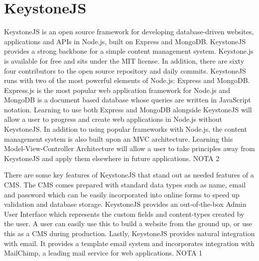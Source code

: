 \section{KeystoneJS}
\label{sec:CMS_ksjs}

KeystoneJS is an open source framework for developing database-driven websites, applications and APIs in Node.js, built on Express and MongoDB.
KeystoneJS provides a strong backbone for a simple content management system. Keystone.js is available for free and sits under the MIT license. In addition, there are sixty four contributors to the open source repository and daily commits.
KeystoneJS runs with two of the most powerful elements of Node.js: Express and MongoDB. Express.js is the most popular web application framework for Node.js and MongoDB is a document based database whose queries are written in JavaScript notation. Learning to use both Express and MongoDB alongside KeystoneJS will allow a user to progress and create web applications in Node.js without KeystoneJS. In addition to using popular frameworks with Node.js, the content management system is also built upon an MVC architecture. Learning this Model-View-Controller Architecture will allow a user to take principles away from KeystoneJS and apply them elsewhere in future applications. NOTA 2

There are some key features of KeystoneJS that stand out as needed features of a CMS. The CMS comes prepared with standard data types such as name, email and password which can be easily incorporated into online forms to speed up validation and database storage. KeystoneJS provides an out-of-the-box Admin User Interface which represents the custom fields and content-types created by the user. A user can easily use this to build a website from the ground up, or use this as a CMS during production. Lastly, KeystoneJS provides natural integration with email. It provides a template email system and incorporates integration with MailChimp, a leading mail service for web applications. NOTA 1